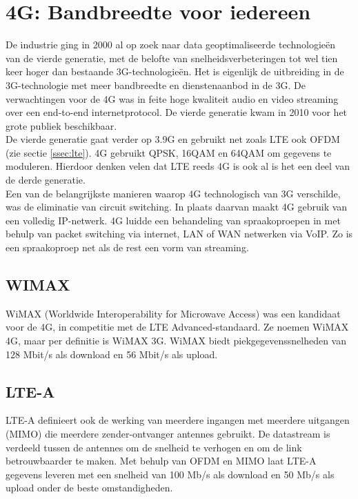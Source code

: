 \documentclass{article}
\begin{document}
\section{4G: Bandbreedte voor iedereen}

De industrie ging in 2000 al op zoek naar data geoptimaliseerde technologieën van de vierde generatie, met de belofte van snelheidsverbeteringen tot wel tien keer hoger dan bestaande 3G-technologieën. Het is eigenlijk de uitbreiding in de 3G-technologie met meer bandbreedte en dienstenaanbod in de 3G. De verwachtingen voor de 4G was in feite hoge kwaliteit audio en video streaming over een end-to-end internetprotocol. De vierde generatie kwam in 2010 voor het grote publiek beschikbaar.\\

\noindent De vierde generatie gaat verder op 3.9G en gebruikt net zoals LTE ook OFDM (zie sectie \ref{ssec:lte}).  4G gebruikt QPSK, 16QAM en 64QAM om gegevens te moduleren. Hierdoor denken velen dat LTE reeds 4G is ook al is het een deel van de derde generatie.\\

\noindent Een van de belangrijkste manieren waarop 4G technologisch van 3G verschilde, was de eliminatie van circuit switching. In plaats daarvan maakt 4G gebruik van een volledig IP-netwerk. 4G luidde een behandeling van spraakoproepen in met behulp van packet switching via internet, LAN of WAN netwerken via VoIP. Zo is een spraakoproep net als de rest een vorm van streaming. \\

\subsection{WIMAX}
WiMAX (Worldwide Interoperability for Microwave Access) was een kandidaat voor de 4G, in competitie met de LTE Advanced-standaard. Ze noemen WiMAX 4G, maar per definitie is WiMAX 3G. WiMAX biedt piekgegevenssnelheden van 128 Mbit/s als download en 56 Mbit/s als upload. \cite{3g} \cite{wimax}

\subsection{LTE-A} \label{ssec:LTE-A}
LTE-A definieert ook de werking van meerdere ingangen met meerdere uitgangen (MIMO) die meerdere zender-ontvanger antennes gebruikt. De datastream is verdeeld tussen de antennes om de snelheid te verhogen en om de link betrouwbaarder te maken. Met behulp van OFDM en MIMO laat LTE-A gegevens leveren met een snelheid van 100 Mb/s als download en 50 Mb/s als upload onder de beste omstandigheden. \cite{3g}
\end{document}
